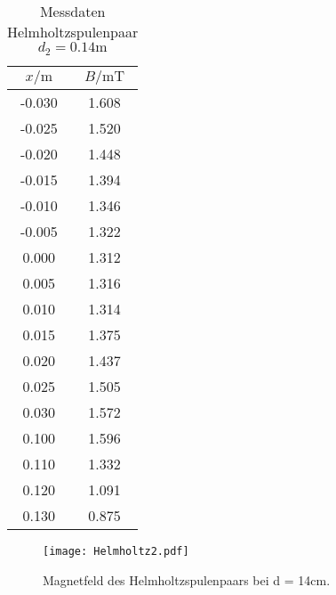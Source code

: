 \begin{table}
\centering
\caption{Messdaten Helmholtzspulenpaar $d_{2} = 0.14\unit\m$}
\begin{tabular}{c c}
  \toprule
  $x / \unit\m$ &  $B / \unit{\milli\tesla}$ \\
  \midrule
  -0.030 &        1.608 \\
  -0.025 &        1.520 \\
  -0.020 &        1.448 \\
  -0.015 &        1.394 \\
  -0.010 &        1.346 \\
  -0.005 &        1.322 \\
   0.000 &        1.312 \\
   0.005 &        1.316 \\
   0.010 &        1.314 \\
   0.015 &        1.375 \\
   0.020 &        1.437 \\
   0.025 &        1.505 \\
   0.030 &        1.572 \\
   0.100 &        1.596 \\
   0.110 &        1.332 \\
   0.120 &        1.091 \\
   0.130 &        0.875 \\
  \bottomrule
  \end{tabular}
\end{table}

\begin{figure}
  \centering
  \texttt{[image: Helmholtz2.pdf]}
  \caption{Magnetfeld des Helmholtzspulenpaars bei d = 14cm.}
  \label{fig:Helmholtz2}
\end{figure}

